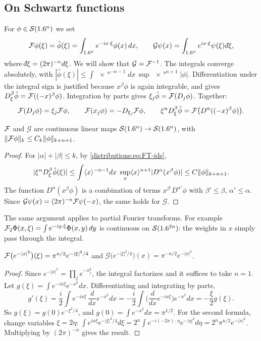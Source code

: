 \subsection{On Schwartz functions}
For $\phi\in\mathcal{S}(1.6^n)$ we set
\begin{equation}\label{distributions:eq:FT}
  \cF\phi(\xi)=\hat\phi(\xi)=\int_{\R^n}e^{-ix\cdot\xi}\phi(x)\,dx,\qquad
  \mathcal{G}\psi(x)=\int_{\R^n}e^{ix\cdot\xi}\psi(\xi)\,\dbar\xi,
\end{equation}
where $\dbar\xi=(2\pi)^{-n}d\xi$. We will show that $\mathcal{G}=\mathcal{F}^{-1}$. The
integrals converge absolutely, with
$|\hat\phi(\xi)|\le\int\ang{x}^{-n-1}dx\,\sup\ang{x}^{n+1}|\phi|$. Differentiation under
the integral sign is justified because $x^\beta\phi$ is again integrable, and gives
$D_\xi^\beta\hat\phi=\mathcal{F}((-x)^\beta\phi)$. Integration by parts gives
$\xi_j\hat\phi=\mathcal{F}(D_j\phi)$. Together:
\begin{equation}\label{distributions:eq:FT-ids}
  \mathcal{F}(D_j\phi)=\xi_j\mathcal{F}\phi,\qquad\mathcal{F}(x_j\phi)=-D_{\xi_j}\mathcal{F}\phi,\qquad
  \xi^\alpha D_\xi^\beta\hat\phi=\mathcal{F}\big(D^\alpha((-x)^\beta\phi)\big).
\end{equation}

\begin{proposition}\label{distributions:prop:FT-cont}
$\mathcal{F}$ and $\mathcal{G}$ are continuous linear maps $\mathcal{S}(1.6^n)\to\mathcal{S}(1.6^n)$, with
$\lVert \mathcal{F}\phi\rVert_k\le C_k\lVert \phi\rVert_{k+n+1}$.
\end{proposition}
\begin{proof}
For $|\alpha|+|\beta|\le k$, by \eqref{distributions:eq:FT-ids},
\[
  |\xi^\alpha D_\xi^\beta\hat\phi(\xi)|\le\int\langle x\rangle^{-n-1}dx\;
  \sup_x\langle x\rangle^{n+1}|D^\alpha(x^\beta\phi)|\le C\lVert \phi\rVert_{k+n+1}.
\]
The function $D^\alpha(x^\beta\phi)$ is a combination of terms $x^{\beta'}D^{\alpha'}\phi$
with $\beta'\le\beta$, $\alpha'\le\alpha$. Since $\mathcal{G}\psi(x)=(2\pi)^{-n}\mathcal{F}\psi(-x)$,
the same holds for $\mathcal{G}$.
\end{proof}

The same argument applies to partial Fourier transforms. For example
$\mathcal{F}_2\Phi(x,\xi)=\int e^{-iy\cdot\xi}\Phi(x,y)\,dy$ is continuous on $\mathcal{S}(1.6^{2n})$:
the weights in $x$ simply pass through the integral.

\begin{lemma}\label{distributions:lem:gaussian}
$\mathcal{F}\big(e^{-|x|^2}\big)(\xi)=\pi^{n/2}e^{-|\xi|^2/4}$ and
$\mathcal{G}\big(e^{-|\xi|^2/4}\big)(x)=\pi^{-n/2}e^{-|x|^2}$.
\end{lemma}
\begin{proof}
Since $e^{-|x|^2}=\prod_je^{-x_j^2}$, the integral factorizes and it suffices to take
$n=1$. Let $g(\xi)=\int e^{-ix\xi}e^{-x^2}dx$. Differentiating and integrating by parts,
\[
  g'(\xi)=\frac i2\int e^{-ix\xi}\,\frac{d}{dx}e^{-x^2}dx
  =-\frac i2\int\Big(\frac{d}{dx}e^{-ix\xi}\Big)e^{-x^2}dx=-\frac\xi2g(\xi).
\]
So $g(\xi)=g(0)e^{-\xi^2/4}$, and $g(0)=\int e^{-x^2}dx=\pi^{1/2}$. For the second
formula, change variables $\xi=2\eta$:
$\int e^{ix\xi}e^{-|\xi|^2/4}d\xi=2^n\int e^{-i(-2x)\cdot\eta}e^{-|\eta|^2}d\eta
=2^n\pi^{n/2}e^{-|x|^2}$. Multiplying by $(2\pi)^{-n}$ gives the result.
\end{proof}

